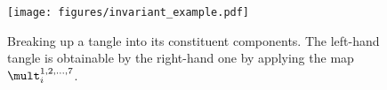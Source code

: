 \begin{figure}[h]
        \centering
        \texttt{[image: figures/invariant\_example.pdf]}
        \caption{Breaking up a tangle into its constituent components. The
        left-hand tangle is obtainable by the right-hand one by applying the map
        $\mult^{1,2,\dots,7}_{i}$.}
        \label{fig:invariant_example}
\end{figure}
